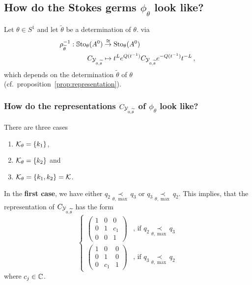\subsection{How do the Stokes germs $\phi_\theta$ look like?}
Let $\theta\in S^1$ and let $\tilde\theta$ be a determination of $\theta$.
via
\begin{align*}
  \rho_{\widetilde\theta}^{-1}:
  \operatorname{\mathbb{S}to}_\theta(A^0)
  &\overset{\cong}\to
  \operatorname{Sto}_\theta(A^0)
  \\C_{\mathcal{Y}_{0,\widetilde\theta}} &\mapsto
  t^{L}e^{Q(t^{-1})}C_{\mathcal{Y}_{0,\widetilde\theta}} e^{-Q(t^{-1})}t^{-L} \,,
\end{align*}
which depends on the determination $\tilde\theta$ of $\theta$ 
(cf.\ proposition~\ref{prop:representation}).
\begin{comment}
  \begin{rem}
    Since the normal solution $t^{L}e^{Q(t^{-1})}$ is diagonal in our case,
    does the Stokes germ in $\Sto_\theta(A^0)$ also have the zeros of
    $C_{\cY_{0,\tilde\theta}}$.
  \end{rem}
\end{comment}

\subsubsection{How do the representations $C_{\mathcal{Y}_{0,\widetilde\theta}}$ of
  $\phi_\theta$ look like?}
There are three cases
\begin{enumerate}
  \item $\mathcal{K}_\theta=\{k_1\}$,
  \item $\mathcal{K}_\theta=\{k_2\}$ and
  \item $\mathcal{K}_\theta=\{k_1,k_2\}=\mathcal{K}$.
\end{enumerate}
In the \textbf{first case}, we have either
$q_2 \underset{\theta,\max}{\prec} q_3$ or
$q_3 \underset{\theta,\max}{\prec} q_2$.
This implies, that the representation of $C_{\mathcal{Y}_{0,\widetilde\theta}}$ has the
form
\[
  \begin{cases}
    \begin{pmatrix}
      1 & 0 & 0
    \\0 & 1 & c_1
    \\0 & 0 & 1
    \end{pmatrix} & \text{,~if~}
    q_2 \underset{\theta,\max}{\prec} q_3
  \\\begin{pmatrix}
      1 & 0 & 0
    \\0 & 1 & 0
    \\0 & c_1 & 1
    \end{pmatrix} & \text{,~if~}
    q_3 \underset{\theta,\max}{\prec} q_2
  \end{cases}
\]
where $c_j\in\mathbb{C}$.
\TODO[is isomorphic to $\C$]

